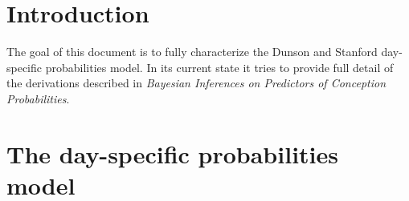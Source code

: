 \documentclass[11pt]{article}
\begin{document}

\setcounter{section}{-1}
\section{Introduction}
The goal of this document is to fully characterize the Dunson and Stanford day-specific probabilities model.  In its current state it tries to provide full detail of the derivations described in \textit{Bayesian Inferences on Predictors of Conception Probabilities}.



\section{The day-specific probabilities model}




\end{document}
